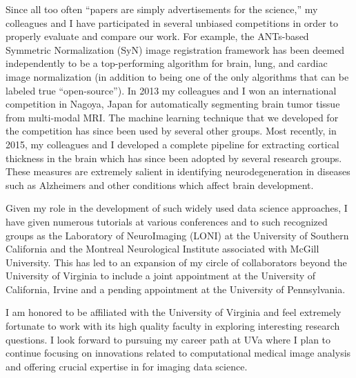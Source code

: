\documentclass[12pt,]{article}
\begin{document}
Since all too often ``papers are simply advertisements for the
science,'' my colleagues and I have participated in several unbiased
competitions in order to properly evaluate and compare our work. For
example, the ANTs-based Symmetric Normalization (SyN) image registration
framework has been deemed independently to be a top-performing algorithm
for brain, lung, and cardiac image normalization (in addition to being
one of the only algorithms that can be labeled true ``open-source''). In
2013 my colleagues and I won an international competition in Nagoya,
Japan for automatically segmenting brain tumor tissue from multi-modal
MRI. The machine learning technique that we developed for the
competition has since been used by several other groups. Most recently,
in 2015, my colleagues and I developed a complete pipeline for
extracting cortical thickness in the brain which has since been adopted
by several research groups. These measures are extremely salient in
identifying neurodegeneration in diseases such as Alzheimers and other
conditions which affect brain development.

Given my role in the development of such widely used data science
approaches, I have given numerous tutorials at various conferences and
to such recognized groups as the Laboratory of NeuroImaging (LONI) at
the University of Southern California and the Montreal Neurological
Institute associated with McGill University. This has led to an
expansion of my circle of collaborators beyond the University of
Virginia to include a joint appointment at the University of California,
Irvine and a pending appointment at the University of Pennsylvania.

I am honored to be affiliated with the University of Virginia and feel
extremely fortunate to work with its high quality faculty in exploring
interesting research questions. I look forward to pursuing my career
path at UVa where I plan to continue focusing on innovations related to
computational medical image analysis and offering crucial expertise in
for imaging data science.
\end{document}
